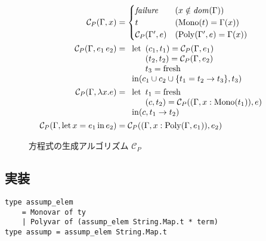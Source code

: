 \begin{figure}[htbp]
  \begin{align*}
    \mathcal{C}_P(\Gamma, x) &=
      \begin{cases}
        \mathit{failure}          & (x \notin \mathit{dom}(\Gamma)) \\
        t                         & (\mathrm{Mono}(t) = \Gamma(x)) \\
        \mathcal{C}_P(\Gamma', e) & (\mathrm{Poly}(\Gamma', e) = \Gamma(x)) \\
      \end{cases} \\
    \mathcal{C}_P(\Gamma, e_1 \, e_2) &=
      \begin{array}[t]{l}
        \mathrm{let}
          \begin{array}[t]{l}
            (c_1, t_1) = \mathcal{C}_P(\Gamma, e_1) \\
            (t_2, t_2) = \mathcal{C}_P(\Gamma, e_2) \\
            t_3 = \mathrm{fresh}
          \end{array} \\
        \mathrm{in} (c_1 \cup c_2 \cup \{t_1 = t_2 \to t_3\}, t_3)
      \end{array} \\
    \mathcal{C}_P(\Gamma, \lambda x . e) &=
      \begin{array}[t]{l}
        \mathrm{let}
          \begin{array}[t]{l}
            t_1 = \mathrm{fresh} \\
            (c, t_2) = \mathcal{C}_P((\Gamma, x : \mathrm{Mono}(t_1)), e)
          \end{array} \\
        \mathrm{in} (c, t_1 \to t_2)
      \end{array} \\
    \mathcal{C}_P(\Gamma, \mathrm{let} \, x = e_1 \, \mathrm{in} \, e_2) &=
      \mathcal{C}_P((\Gamma, x : \mathrm{Poly}(\Gamma, e_1)), e_2)
  \end{align*}
  \caption{方程式の生成アルゴリズム $\mathcal C_P$}
  \label{fig:algorithm-cp}
\end{figure}



\subsection{実装}



\begin{lstlisting}
type assump_elem
    = Monovar of ty
    | Polyvar of (assump_elem String.Map.t * term)
type assump = assump_elem String.Map.t
\end{lstlisting}




